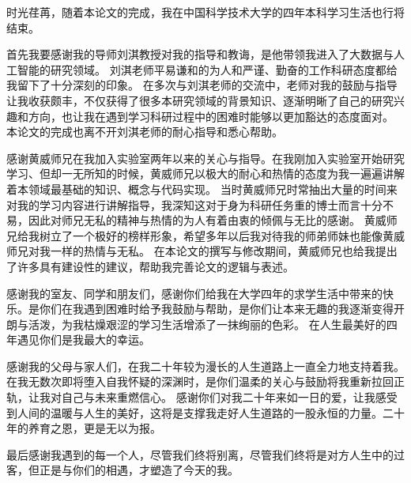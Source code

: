 
\begin{acknowledgements}



    时光荏苒，随着本论文的完成，我在中国科学技术大学的四年本科学习生活也行将结束。

    首先我要感谢我的导师刘淇教授对我的指导和教诲，是他带领我进入了大数据与人工智能的研究领域。
    刘淇老师平易谦和的为人和严谨、勤奋的工作科研态度都给我留下了十分深刻的印象。
    在多次与刘淇老师的交流中，老师对我的鼓励与指导让我收获颇丰，不仅获得了很多本研究领域的背景知识、逐渐明晰了自己的研究兴趣和方向，也让我在遇到学习科研过程中的困难时能够以更加豁达的态度面对。
    本论文的完成也离不开刘淇老师的耐心指导和悉心帮助。

    感谢黄威师兄在我加入实验室两年以来的关心与指导。在我刚加入实验室开始研究学习、但却一无所知的时候，黄威师兄以极大的耐心和热情的态度为我一遍遍讲解着本领域最基础的知识、概念与代码实现。
    当时黄威师兄时常抽出大量的时间来对我的学习内容进行讲解指导，我深知这对于身为科研任务重的博士而言十分不易，因此对师兄无私的精神与热情的为人有着由衷的倾佩与无比的感谢。
    黄威师兄给我树立了一个极好的榜样形象，希望多年以后我对待我的师弟师妹也能像黄威师兄对我一样的热情与无私。
    在本论文的撰写与修改期间，黄威师兄也给我提出了许多具有建设性的建议，帮助我完善论文的逻辑与表述。

    感谢我的室友、同学和朋友们，感谢你们给我在大学四年的求学生活中带来的快乐。是你们在我遇到困难时给予我鼓励与帮助，是你们让本来无趣的我逐渐变得开朗与活泼，为我枯燥艰涩的学习生活增添了一抹绚丽的色彩。
    在人生最美好的四年遇见你们是我最大的幸运。

    感谢我的父母与家人们，在我二十年较为漫长的人生道路上一直全力地支持着我。在我无数次即将堕入自我怀疑的深渊时，是你们温柔的关心与鼓励将我重新拉回正轨，让我对自己与未来重燃信心。
    感谢你们对我二十年来如一日的爱，让我感受到人间的温暖与人生的美好，这将是支撑我走好人生道路的一股永恒的力量。二十年的养育之恩，更是无以为报。

    最后感谢我遇到的每一个人，尽管我们终将别离，尽管我们终将是对方人生中的过客，但正是与你们的相遇，才塑造了今天的我。

\end{acknowledgements}
